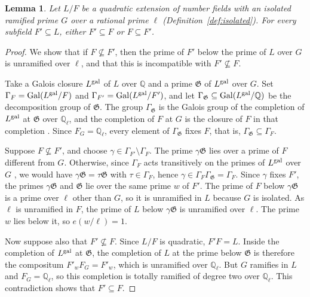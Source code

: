 \documentclass[11pt]{article}
\theoremstyle{plain}
\newtheorem{lemma}[theorem]{Lemma}
\theoremstyle{definition}
\theoremstyle{remark}
\DeclareMathOperator{\Gal}{Gal}
\newcommand{\Q}{\mathbb Q}
\begin{document}
\begin{lemma}\label{lem:witness}
Let $L/F$ be a quadratic extension of number fields with an isolated
ramified prime $G$ over a rational prime $\ell$
(Definition~\ref{def:isolated}).  For every subfield $F'\subseteq L$,
either $F'\subseteq F$ or $F\subseteq F'$.
\end{lemma}
\begin{proof}
We show that if $F\nsubseteq F'$, then the prime of $F'$ below the
prime of $L$ over $G$ is unramified over $\ell$, and that this is
incompatible with $F'\nsubseteq F$.

Take a Galois closure $L^{\rm gal}$ of $L$ over $\Q$ and a prime
$\mathfrak G$ of $L^{\rm gal}$ over $G$.  Set
$\Gamma_F=\Gal(L^{\rm gal}/F)$ and $\Gamma_{F'}=\Gal(L^{\rm gal}/F')$, and
let $\Gamma_{\mathfrak G}\subseteq\Gal(L^{\rm gal}/\Q)$ be the
decomposition group of $\mathfrak G$.  The group $\Gamma_{\mathfrak G}$ is
the Galois group of the completion of $L^{\rm gal}$ at $\mathfrak G$ over
$\Q_\ell$, and the completion of $F$ at $G$ is the closure of $F$ in that
completion \cite[Propositions~8.10 and~8.13(a)]{MilneANT}.  Since
$F_G=\Q_\ell$, every element of $\Gamma_{\mathfrak G}$ fixes $F$, that
is, $\Gamma_{\mathfrak G}\subseteq\Gamma_F$.

Suppose $F\nsubseteq F'$, and choose $\gamma\in\Gamma_{F'}\setminus\Gamma_F$.
The prime $\gamma\mathfrak G$ lies over a prime of $F$ different from $G$.
Otherwise, since $\Gamma_F$ acts transitively on the primes of
$L^{\rm gal}$ over $G$ \cite[proof of Theorem~3.34]{MilneANT}, we would
have $\gamma\mathfrak G=\tau\mathfrak G$ with $\tau\in\Gamma_F$, hence
$\gamma\in\Gamma_F\Gamma_{\mathfrak G}=\Gamma_F$.  Since $\gamma$ fixes
$F'$, the primes $\gamma\mathfrak G$ and $\mathfrak G$ lie over the same
prime $w$ of $F'$.  The prime of $F$ below $\gamma\mathfrak G$ is a prime
over $\ell$ other than $G$, so it is unramified in $L$ because $G$ is
isolated.  As $\ell$ is unramified in $F$, the prime of $L$ below
$\gamma\mathfrak G$ is unramified over $\ell$.  The prime $w$ lies below
it, so $e(w/\ell)=1$.

Now suppose also that $F'\nsubseteq F$.  Since $L/F$ is quadratic,
$F'F=L$.  Inside the completion of $L^{\rm gal}$ at $\mathfrak G$, the
completion of $L$ at the prime below $\mathfrak G$ is therefore the
compositum $F'_wF_G=F'_w$, which is unramified over $\Q_\ell$.  But $G$
ramifies in $L$ and $F_G=\Q_\ell$, so this completion is totally ramified
of degree two over $\Q_\ell$.  This contradiction shows that
$F'\subseteq F$.
\end{proof}
\end{document}
